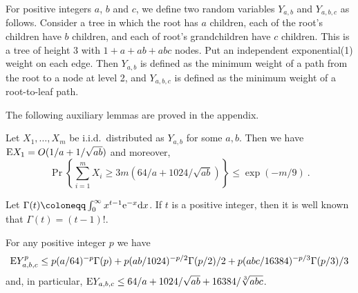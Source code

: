 \documentclass{patmorin}
\DeclareMathOperator{\erlang}{Erlang}
\newcommand{\abas}[1]{\textcolor{orange}{\big[Abbas: #1\big]}}
\begin{document}

For positive integers $a$, $b$ and $c$, we define two random variables $Y_{a,b}$  and $Y_{a,b,c}$ as follows.
Consider a tree in which the root has $a$ children,
 each of the root's children have $b$ children,
and each of root's grandchildren have $c$ children.
This is a tree of height 3 with
$1 + a + ab + abc$ nodes. 
Put an independent exponential(1) weight on each edge.
Then $Y_{a,b}$ is defined as the minimum weight of a path from the root to a node at level 2,
and $Y_{a,b,c}$ is defined as the minimum weight of a root-to-leaf path.

The following auxiliary lemmas are proved in the appendix.

\begin{lem}
Let $X_1,\dots,X_m$ be i.i.d.\ distributed as $Y_{a,b}$ for some $a,b$.
Then we have
$\mathrm{E} X_1 =O(1/a+1/\sqrt{ab})$ and moreover,
\[
\Pr\left\{\sum_{i=1}^m X_i \geq 3 m (64/a + 1024/\sqrt{ab}) \right\}
\leq
\exp(-m/9)\:.
\]
\end{lem}

Let 
$\Gamma(t) \coloneqq \int_0^\infty x^{t-1} {\rm e}^{-x} \mathrm{d} x$.
If $t$ is a positive integer, then it is well known that $\Gamma(t)=(t-1)!$.

\begin{lem}
For any positive integer $p$ we have
\[
\mathrm{E} Y_{a,b,c}^p \leq
 p (a/64)^{-p}\Gamma(p)
+ p(ab/1024)^{-p/2}\Gamma(p/2)/2
+ p(abc/16384)^{-p/3}\Gamma(p/3)/3
\]
and, in particular,
$\mathrm{E} Y_{a,b,c} \leq 64/a+1024/\sqrt{ab} + 16384/\sqrt[3]{abc}$.
\end{lem}
\end{document}
